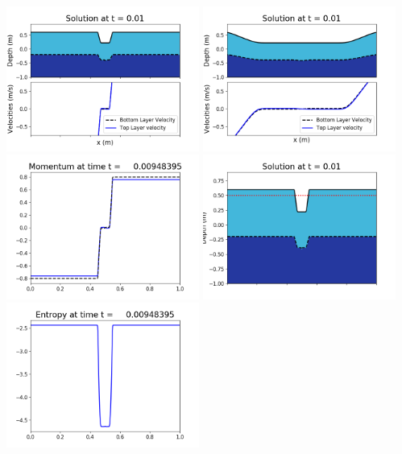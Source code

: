 \documentclass[11pt]{article}
\begin{document}
\vskip 10pt 
\includegraphics[width=0.475\textwidth]{frame0027fig1001.png}
\includegraphics[width=0.475\textwidth]{frame0027fig1002.png}
\vskip 10pt 
\includegraphics[width=0.475\textwidth]{frame0027fig1003.png}
\includegraphics[width=0.475\textwidth]{frame0027fig1006.png}
\vskip 10pt 
\includegraphics[width=0.475\textwidth]{frame0027fig1007.png}
\end{document}
